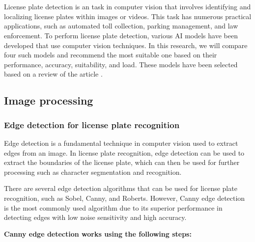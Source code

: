 \chapter{}
\label{chap:license-plate-recognition}

License plate detection is an task in computer vision that involves identifying and localizing license plates within images or videos. 
This task has numerous practical applications, such as automated toll collection, parking management, and law enforcement. 
To perform license plate detection, various AI models have been developed that use computer vision techniques. 
In this research, we will compare four such models and recommend the most suitable one based on their performance, accuracy, suitability, and load. 
These models have been selected based on a review of the article \cite{lic:license-plate}.

\section{Image processing}

    \subsection{Edge detection for license plate recognition}

    Edge detection is a fundamental technique in computer vision used to extract edges from an image. 
    In license plate recognition, edge detection can be used to extract the boundaries of the license plate, which can then be used for further processing such as character segmentation and recognition.

    There are several edge detection algorithms that can be used for license plate recognition, such as Sobel, Canny, and Roberts. 
    However, Canny edge detection is the most commonly used algorithm due to its superior performance in detecting edges with low noise sensitivity and high accuracy.
    \cite{egde:edge-dection}

    \textbf{Canny edge detection works using the following steps:}

